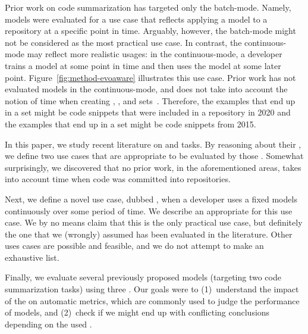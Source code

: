 Prior work on code summarization has targeted only the batch-mode.
Namely, models were evaluated for a use case that reflects applying a
model to a repository at a specific point in time.
Arguably, however, the batch-mode might not be considered as the most practical
use case.  
In contrast, the continuous-mode may reflect more realistic usages: 
in the continuous-mode, a developer trains a model at some point in
time and then uses the model at some later point.
Figure~\ref{fig:method-evoaware} illustrates this use case.  
Prior work has not evaluated models in the continuous-mode, and does not take into account
the notion of time when creating \train, \val, and \test
sets~\cite{TanETAL15Online}.  Therefore, the examples that end up in a
\train set might be code snippets that were included in a repository
in 2020 and the examples that end up in a \test set might be code
snippets from 2015.

In this paper, we study recent literature on \comgen and \methnam
tasks.  By reasoning about their \emethodologies, we define two use
cases that are appropriate to be evaluated by those \methodologies.
Somewhat surprisingly, we discovered that no prior work, in the
aforementioned areas, takes into account time when code was committed
into repositories. 

Next, we define a novel use case, dubbed \cmode, when a developer uses
a fixed models continuously over some period of time.
%
We describe an appropriate \emethodology for this use case.
%
We by no means claim that this is the only practical use case, but
definitely the one that we (wrongly) assumed has been evaluated in the
literature.
%
Other uses cases are possible and feasible, and we do not attempt to
make an exhaustive list.

Finally, we evaluate several previously proposed models (targeting two
code summarization tasks) using three \emethodologies.  Our goals were to
(1)~understand the impact of the \emethodology on automatic metrics,
which are commonly used to judge the performance of models, and
(2)~check if we might end up with conflicting conclusions depending on
the used \methodology.

